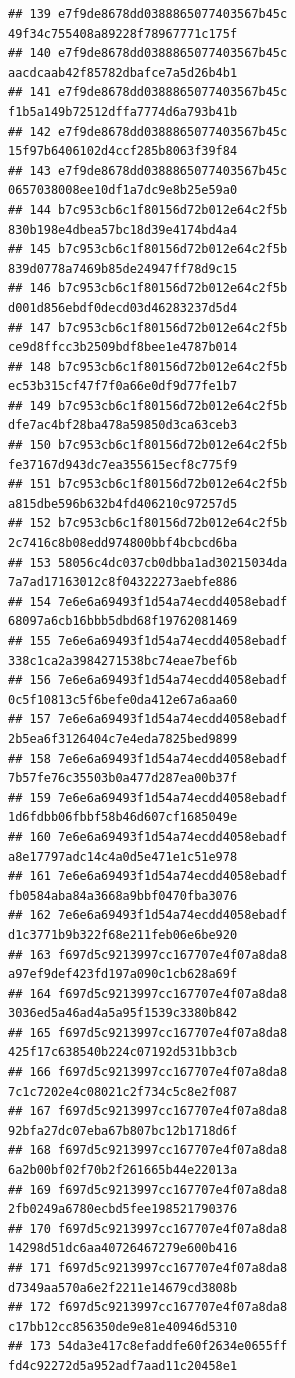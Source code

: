 \documentclass[]{article}
\begin{document}
\begin{verbatim}
## 139 e7f9de8678dd0388865077403567b45c   49f34c755408a89228f78967771c175f
## 140 e7f9de8678dd0388865077403567b45c   aacdcaab42f85782dbafce7a5d26b4b1
## 141 e7f9de8678dd0388865077403567b45c   f1b5a149b72512dffa7774d6a793b41b
## 142 e7f9de8678dd0388865077403567b45c   15f97b6406102d4ccf285b8063f39f84
## 143 e7f9de8678dd0388865077403567b45c   0657038008ee10df1a7dc9e8b25e59a0
## 144 b7c953cb6c1f80156d72b012e64c2f5b   830b198e4dbea57bc18d39e4174bd4a4
## 145 b7c953cb6c1f80156d72b012e64c2f5b   839d0778a7469b85de24947ff78d9c15
## 146 b7c953cb6c1f80156d72b012e64c2f5b   d001d856ebdf0decd03d46283237d5d4
## 147 b7c953cb6c1f80156d72b012e64c2f5b   ce9d8ffcc3b2509bdf8bee1e4787b014
## 148 b7c953cb6c1f80156d72b012e64c2f5b   ec53b315cf47f7f0a66e0df9d77fe1b7
## 149 b7c953cb6c1f80156d72b012e64c2f5b   dfe7ac4bf28ba478a59850d3ca63ceb3
## 150 b7c953cb6c1f80156d72b012e64c2f5b   fe37167d943dc7ea355615ecf8c775f9
## 151 b7c953cb6c1f80156d72b012e64c2f5b   a815dbe596b632b4fd406210c97257d5
## 152 b7c953cb6c1f80156d72b012e64c2f5b   2c7416c8b08edd974800bbf4bcbcd6ba
## 153 58056c4dc037cb0dbba1ad30215034da   7a7ad17163012c8f04322273aebfe886
## 154 7e6e6a69493f1d54a74ecdd4058ebadf   68097a6cb16bbb5dbd68f19762081469
## 155 7e6e6a69493f1d54a74ecdd4058ebadf   338c1ca2a3984271538bc74eae7bef6b
## 156 7e6e6a69493f1d54a74ecdd4058ebadf   0c5f10813c5f6befe0da412e67a6aa60
## 157 7e6e6a69493f1d54a74ecdd4058ebadf   2b5ea6f3126404c7e4eda7825bed9899
## 158 7e6e6a69493f1d54a74ecdd4058ebadf   7b57fe76c35503b0a477d287ea00b37f
## 159 7e6e6a69493f1d54a74ecdd4058ebadf   1d6fdbb06fbbf58b46d607cf1685049e
## 160 7e6e6a69493f1d54a74ecdd4058ebadf   a8e17797adc14c4a0d5e471e1c51e978
## 161 7e6e6a69493f1d54a74ecdd4058ebadf   fb0584aba84a3668a9bbf0470fba3076
## 162 7e6e6a69493f1d54a74ecdd4058ebadf   d1c3771b9b322f68e211feb06e6be920
## 163 f697d5c9213997cc167707e4f07a8da8   a97ef9def423fd197a090c1cb628a69f
## 164 f697d5c9213997cc167707e4f07a8da8   3036ed5a46ad4a5a95f1539c3380b842
## 165 f697d5c9213997cc167707e4f07a8da8   425f17c638540b224c07192d531bb3cb
## 166 f697d5c9213997cc167707e4f07a8da8   7c1c7202e4c08021c2f734c5c8e2f087
## 167 f697d5c9213997cc167707e4f07a8da8   92bfa27dc07eba67b807bc12b1718d6f
## 168 f697d5c9213997cc167707e4f07a8da8   6a2b00bf02f70b2f261665b44e22013a
## 169 f697d5c9213997cc167707e4f07a8da8   2fb0249a6780ecbd5fee198521790376
## 170 f697d5c9213997cc167707e4f07a8da8   14298d51dc6aa40726467279e600b416
## 171 f697d5c9213997cc167707e4f07a8da8   d7349aa570a6e2f2211e14679cd3808b
## 172 f697d5c9213997cc167707e4f07a8da8   c17bb12cc856350de9e81e40946d5310
## 173 54da3e417c8efaddfe60f2634e0655ff   fd4c92272d5a952adf7aad11c20458e1

\end{verbatim}
\end{document}
